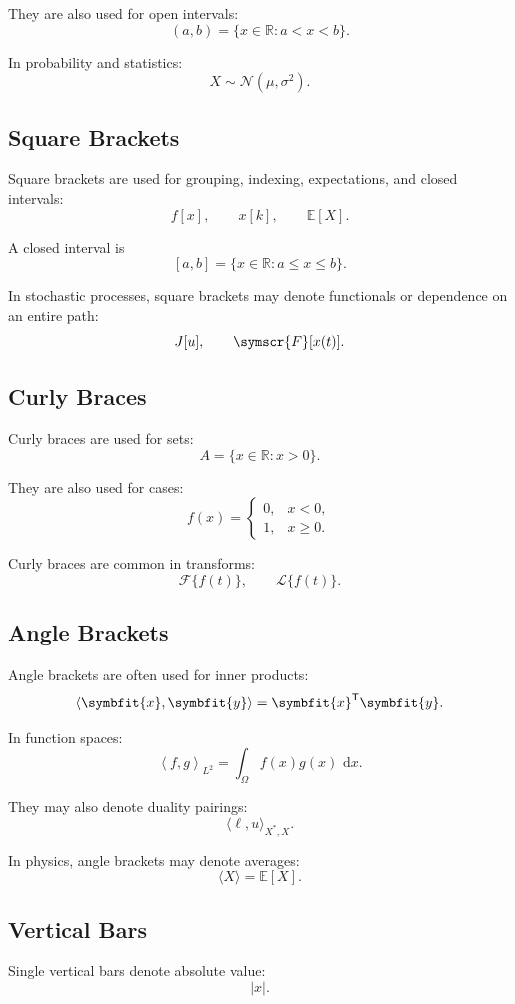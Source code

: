 \documentclass[11pt,twocolumn]{article}
\newcommand{\R}{\mathbb{R}}
\newcommand{\vct}[1]{\symbfit{#1}}   %
\newcommand{\T}{^{\mathsf{T}}}
\newcommand{\abs}[1]{\left\lvert #1 \right\rvert}
\newcommand{\inner}[2]{\left\langle #1, #2 \right\rangle}
\newcommand{\dd}{\,\mathrm{d}}
\newcommand{\E}{\mathbb{E}}
\newcommand{\Normal}{\mathcal{N}}
\begin{document}
They are also used for open intervals:
\[
(a,b)
=
\{x\in\R : a<x<b\}.
\]

In probability and statistics:
\[
X \sim \Normal(\mu,\sigma^2).
\]

\subsection{Square Brackets}

Square brackets are used for grouping, indexing, expectations, and closed
intervals:
\[
f[x],
\qquad
x[k],
\qquad
\E[X].
\]

A closed interval is
\[
[a,b]
=
\{x\in\R : a\le x\le b\}.
\]

In stochastic processes, square brackets may denote functionals or dependence
on an entire path:
\[
J[u],
\qquad
\symscr{F}[x(t)].
\]

\subsection{Curly Braces}

Curly braces are used for sets:
\[
A
=
\{x\in\R : x>0\}.
\]

They are also used for cases:
\[
f(x)
=
\begin{cases}
0, & x<0,\\
1, & x\ge 0.
\end{cases}
\]

Curly braces are common in transforms:
\[
\mathcal{F}\{f(t)\},
\qquad
\mathcal{L}\{f(t)\}.
\]

\subsection{Angle Brackets}

Angle brackets are often used for inner products:
\[
\inner{\vct{x}}{\vct{y}}
=
\vct{x}\T\vct{y}.
\]

In function spaces:
\[
\inner{f}{g}_{L^2}
=
\int_{\Omega} f(x)g(x)\,\dd x.
\]

They may also denote duality pairings:
\[
\langle \ell,u\rangle_{X^*,X}.
\]

In physics, angle brackets may denote averages:
\[
\langle X\rangle
=
\E[X].
\]

\subsection{Vertical Bars}

Single vertical bars denote absolute value:
\[
\abs{x}.
\]
\end{document}
